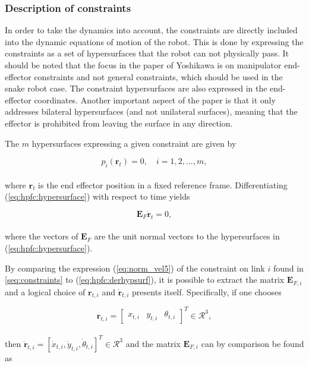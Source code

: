 \subsubsection{Description of constraints}

In order to take the dynamics into account, the constraints are directly included into the dynamic equations of motion of the robot. This is done by expressing the constraints as a set of hypersurfaces that the robot can not physically pass. It should be noted that the focus in the paper of Yoshikawa \cite{yoshikawa1987dynamic} is on manipulator end-effector constraints and not general constraints, which should be used in the snake robot case. The constraint hypersurfaces are also expressed in the end-effector coordinates. Another important aspect of the paper is that it only addresses bilateral hypersurfaces (and not unilateral surfaces), meaning that the effector is prohibited from leaving the surface in any direction.

The $m$ hypersurfaces expressing a given constraint are given by

\begin{equation}\label{eq:hpfc:hypersurface}
    p_i(\mathbf{r}_t) = 0, \quad i = 1, 2, ..., m,
\end{equation}
\\
where $\mathbf{r}_t$ is the end effector position in a fixed reference frame. Differentiating (\ref{eq:hpfc:hypersurface}) with respect to time yields

\begin{equation}\label{eq:hpfc:derhypsurf}
    \mathbf{E}_F \mathbf{\dot{r}}_t = 0,
\end{equation}
\\
where the vectors of $\mathbf{E}_F$ are the unit normal vectors to the hypersurfaces in (\ref{eq:hpfc:hypersurface}).

By comparing the expression (\ref{eq:norm_vel5}) of the constraint on link $i$ found in \ref{seq:constraints} to (\ref{eq:hpfc:derhypsurf}), it is possible to extract the matrix $\mathbf{E}_{F,i}$ and a logical choice of $\mathbf{r}_{t,i}$ and $\mathbf{\dot{r}}_{t,i}$ presents itself.
Specifically, if one chooses

\begin{equation}
    \mathbf{r}_{t,i} =
    \begin{bmatrix}
        x_{t,i} & y_{t,i} & \theta_{t,i}
    \end{bmatrix}^T \in \mathcal{R}^3,
\end{equation}
\\
then $\mathbf{\dot{r}}_{t,i} = [\dot{x}_{t,i}, \dot{y}_{t,i}, \dot{\theta}_{t,i}]^T \in \mathcal{R}^3$ and the matrix $\mathbf{E}_{F,i}$ can by comparison be found as

